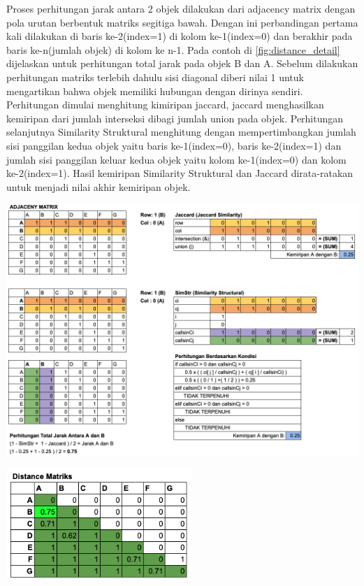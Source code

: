 Proses perhitungan jarak antara 2 objek dilakukan dari adjacency matrix dengan pola urutan berbentuk matriks segitiga bawah. Dengan ini perbandingan pertama kali dilakukan di baris ke-2(index=1) di kolom ke-1(index=0) dan berakhir pada baris ke-n(jumlah objek) di kolom  ke n-1. Pada contoh di \ref{fig:distance_detail} dijelaskan untuk perhitungan total jarak pada objek B dan A. Sebelum dilakukan perhitungan matriks terlebih dahulu sisi diagonal diberi nilai 1 untuk mengartikan bahwa objek memiliki hubungan dengan dirinya sendiri.  Perhitungan dimulai menghitung kimiripan jaccard, jaccard menghasilkan kemiripan dari jumlah interseksi dibagi jumlah union pada objek. Perhitungan selanjutnya Similarity Struktural menghitung dengan mempertimbangkan jumlah sisi panggilan kedua objek yaitu baris ke-1(index=0), baris ke-2(index=1) dan jumlah sisi panggilan keluar kedua objek yaitu kolom  ke-1(index=0) dan kolom ke-2(index=1). Hasil kemiripan Similarity Struktural dan Jaccard dirata-ratakan untuk menjadi nilai akhir kemiripan objek.

\begin{center}
	\includegraphics[width=14cm]{img/bab_3/distance_detail.png}
	\label{fig:distance_detail}
\end{center}

\begin{center}
	\includegraphics[width=7cm]{img/bab_3/distance_final.png}
	\label{fig:asd}
\end{center}

